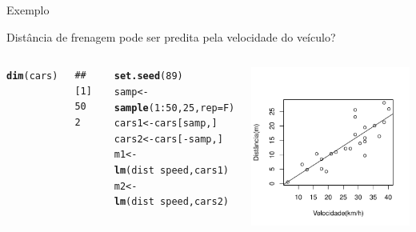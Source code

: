 \documentclass{beamer}\usepackage[]{graphicx}\usepackage[]{color}
\makeatletter
\newcommand{\hlnum}[1]{\textcolor[rgb]{0.686,0.059,0.569}{#1}}%
\newcommand{\hlopt}[1]{\textcolor[rgb]{0,0,0}{#1}}%
\newcommand{\hlstd}[1]{\textcolor[rgb]{0.345,0.345,0.345}{#1}}%
\newcommand{\hlkwb}[1]{\textcolor[rgb]{0.69,0.353,0.396}{#1}}%
\newcommand{\hlkwc}[1]{\textcolor[rgb]{0.333,0.667,0.333}{#1}}%
\newcommand{\hlkwd}[1]{\textcolor[rgb]{0.737,0.353,0.396}{\textbf{#1}}}%
\newenvironment{kframe}{%
 \def\at@end@of@kframe{}%
 \ifinner\ifhmode%
  \def\at@end@of@kframe{\end{minipage}}%
  \begin{minipage}{\columnwidth}%
 \fi\fi%
 \def\FrameCommand##1{\hskip\@totalleftmargin \hskip-\fboxsep
 \colorbox{shadecolor}{##1}\hskip-\fboxsep
     \hskip-\linewidth \hskip-\@totalleftmargin \hskip\columnwidth}%
 \MakeFramed {\advance\hsize-\width
   \@totalleftmargin\z@ \linewidth\hsize
   \@setminipage}}%
 {\par\unskip\endMakeFramed%
 \at@end@of@kframe}
\newenvironment{knitrout}{}{} %
\renewenvironment{knitrout}{\setlength{\topsep}{0mm}}{}
\makeatother
\begin{document}
\begin{frame}[fragile]{Exemplo}

 Distância de frenagem pode ser predita pela velocidade do veículo?

\begin{columns}[c]


\begin{knitrout}\tiny
{}\color{fgcolor}\begin{kframe}
\begin{alltt}
\hlkwd{dim}\hlstd{(cars)}
\end{alltt}
\begin{verbatim}
## [1] 50  2
\end{verbatim}
\begin{alltt}
\hlkwd{set.seed}\hlstd{(}\hlnum{89}\hlstd{)}
\hlstd{samp} \hlkwb{<-} \hlkwd{sample}\hlstd{(}\hlnum{1}\hlopt{:}\hlnum{50}\hlstd{,}\hlnum{25}\hlstd{,}\hlkwc{rep}\hlstd{=F)}
\hlstd{cars1} \hlkwb{<-} \hlstd{cars[samp,]}
\hlstd{cars2} \hlkwb{<-} \hlstd{cars[}\hlopt{-}\hlstd{samp,]}
\hlstd{m1} \hlkwb{<-} \hlkwd{lm}\hlstd{(dist} \hlopt{~} \hlstd{speed, cars1)}
\hlstd{m2} \hlkwb{<-} \hlkwd{lm}\hlstd{(dist} \hlopt{~} \hlstd{speed, cars2)}
\end{alltt}
\end{kframe}
\end{knitrout}


\begin{knitrout}\scriptsize
{}\color{fgcolor}
\includegraphics[width=.7\linewidth]{figure/v4-1} 


\end{knitrout}
\end{columns}
\end{frame}
\end{document}
